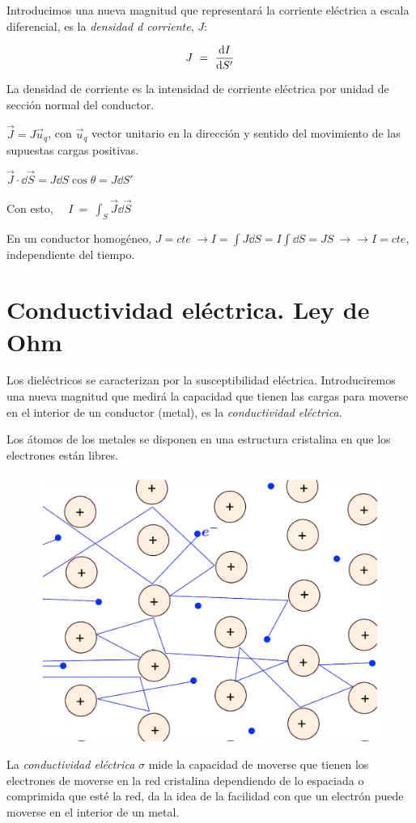 Introducimos una nueva magnitud que representará la corriente eléctrica a escala diferencial, es la \emph{densidad d corriente}, $J$:

$$J\ =\ \displaystyle \dv{I}{S'}$$

La densidad de corriente es la intensidad de corriente eléctrica por unidad de sección normal del conductor.

$\vec J=J\vec u_q$, con $\vec u_q$ vector unitario en la dirección y sentido del movimiento de las supuestas cargas positivas. 

$\vec J \cdot \dd \vec S = J \dd S \cos \theta = J \dd S'$

Con esto, $\quad \displaystyle I\ = \ \int_S \vec J \dd \vec S$

En un conductor homogéneo, $J=cte \ \to I=\int J \dd S = I \int \dd S = JS \ \to \to I=cte$, independiente del tiempo.

\section{Conductividad eléctrica. Ley de Ohm}

\begin{multicols}{2}
Los dieléctricos se caracterizan por la susceptibilidad eléctrica. Introduciremos una nueva magnitud que medirá la capacidad que tienen las cargas para moverse en el interior de un conductor (metal), es la \emph{conductividad eléctrica}.

Los átomos de los metales se disponen en una estructura cristalina en que los electrones están libres.

\begin{figure}[H]
	\centering
	\includegraphics[width=.55\textwidth]{imagenes/imagenes25/T25IM01.png}
\end{figure}
\end{multicols}

La \emph{conductividad eléctrica} $\sigma$ mide la capacidad de moverse que tienen los electrones de moverse en la red cristalina dependiendo de lo espaciada o comprimida que esté la red, da la idea de la facilidad con que un electrón puede moverse en el interior de un metal.

